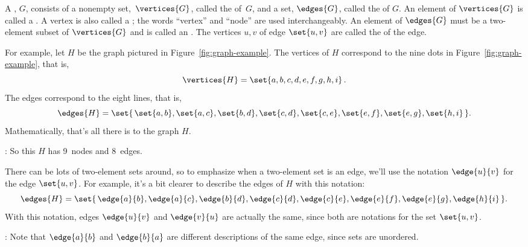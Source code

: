 \begin{definition}\label{graphdef}
\begin{editingnotes}
\end{editingnotes}
  A , $G$, consists of a nonempty set,~$\vertices{G}$,
  called the  of~$G$, and a set, $\edges{G}$, called the
   of $G$.  An element of $\vertices{G}$ is called a
  .  A vertex is also called a ; the words
  ``vertex'' and ``node'' are used interchangeably.  An element of
  $\edges{G}$ must be a two-element subset of $\vertices{G}$ and is called
  an .  The vertices $u, v$ of edge $\set{u,v}$ are called the
   of the edge.
\end{definition}

For example, let $H$ be the graph pictured in
Figure~\ref{fig:graph-example}.  The vertices of $H$ correspond to the
nine dots in Figure~\ref{fig:graph-example}, that is,
\[
\vertices{H} =  \set{a, b, c, d, e, f, g, h, i}\, .
\]
The edges correspond to the eight lines, that is,
\[
\edges{H} =  \set{\, \set{a, b}, \set{a, c}, \set{b, d}, \set{c, d},
              \set{c, e}, \set{e, f}, \set{e, g}, \set{h, i} \,}.
\]
Mathematically, that's all there is to the graph $H$.
\begin{editingnotes}
  : So this $H$ has 9~nodes and 8~edges.
\end{editingnotes}

\begin{editingnotes}
\end{editingnotes} There can be lots of two-element
sets around, so to emphasize when a two-element set is an edge, we'll
use the notation $\edge{u}{v}$ for the edge $\set{u,v}$.  For example,
it's a bit clearer to describe the edges of $H$ with this notation:
\[
\edges{H} =  \set{\, \edge{a}{b}, \edge{a}{c}, \edge{b}{d}, \edge{c}{d},
              \edge{c}{e}, \edge{e}{f}, \edge{e}{g}, \edge{h}{i} \,}.
\]
With this notation, edges $\edge{u}{v}$ and $\edge{v}{u}$ are actually the
same, since both are notations for the set $\set{u,v}$.

\begin{editingnotes}
: Note that $\edge{a}{b}$
  and $\edge{b}{a}$ are different descriptions of the same edge, since
  sets are unordered.
\end{editingnotes}

